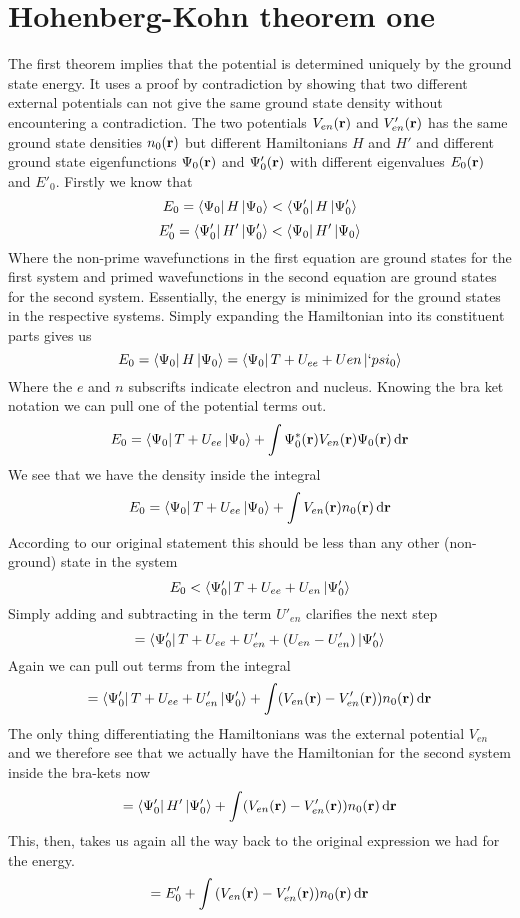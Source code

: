\documentclass{article}
\begin{document}
	\section{Hohenberg-Kohn theorem one}
	The first theorem implies that the potential is determined uniquely by the ground state energy. It uses a proof by contradiction by showing that two different external potentials can not give the same ground state density without encountering a contradiction. The two potentials $V_{en}(\vb{r})$ and $V_{en}'(\vb{r})$ has the same ground state densities $n_0(\vb{r})$ but different Hamiltonians $H$ and $H'$ and different ground state eigenfunctions $\Psi_0(\vb{r})$ and $\Psi'_0(\vb{r})$ with different eigenvalues $E_0(\vb{r})$ and $E'_0$. Firstly we know that
	$$E_0 = \bra{\Psi_0}H\ket{\Psi_0} < \bra{\Psi'_0}H\ket{\Psi'_0}$$
	$$E'_0 = \bra{\Psi'_0}H'\ket{\Psi'_0} < \bra{\Psi_0}H'\ket{\Psi_0}$$
	Where the non-prime wavefunctions in the first equation are ground states for the first system and primed wavefunctions in the second equation are ground states for the second system. Essentially, the energy is minimized for the ground states in the respective systems. Simply expanding the Hamiltonian into its constituent parts gives us
	$$ E_0 = \bra{\Psi_0}H\ket{\Psi_0} = \bra{\Psi_0}T+U_{ee}+U{en}\ket{`psi_0}$$
	Where the $e$ and $n$ subscrifts indicate electron and nucleus. Knowing the bra ket notation we can pull one of the potential terms out.
	$$ E_0 = \bra{\Psi_0} T+U_{ee} \ket{\Psi_0} + \int \Psi^*_0(\vb{r})V_{en}(\vb{r})\Psi_0(\vb{r})\dd{\vb{r}}$$
	We see that we have the density inside the integral
	$$ E_0 = \bra{\Psi_0} T+U_{ee} \ket{\Psi_0} + \int V_{en}(\vb{r})n_0(\vb{r})\dd{\vb{r}}$$
	According to our original statement this should be less than any other (non-ground) state in the system
	$$ E_0 < \bra{\Psi'_0} T+U_{ee}+U_{en} \ket{\Psi'_0} $$
	Simply adding and subtracting in the term $U'_{en}$ clarifies the next step
	$$ = \bra{\Psi'_0} T+U_{ee}+U'_{en}+(U_{en}-U'_{en}) \ket{\Psi'_0} $$
	Again we can pull out terms from the integral
	$$ = \bra{\Psi'_0} T+U_{ee}+U'_{en} \ket{\Psi'_0} + \int (V_{en}(\vb{r})-V'_{en}(\vb{r}))n_0(\vb{r})\dd{\vb{r}}$$
	The only thing differentiating the Hamiltonians was the external potential $V_{en}$ and we therefore see that we actually have the Hamiltonian for the second system inside the bra-kets now
	$$ = \bra{\Psi'_0} H' \ket{\Psi'_0} + \int (V_{en}(\vb{r})-V'_{en}(\vb{r}))n_0(\vb{r})\dd{\vb{r}}$$
	This, then, takes us again all the way back to the original expression we had for the energy.
	$$ = E'_0 + \int \qty(V_{en}(\vb{r})-V'_{en}(\vb{r}))n_0(\vb{r})\dd{\vb{r}}$$
\end{document}

